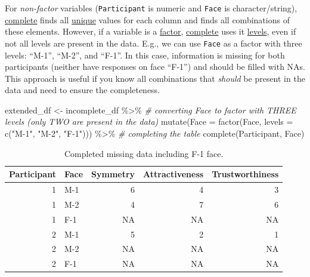 \documentclass[
]{book}
\newenvironment{Shaded}{\begin{snugshade}}{\end{snugshade}}
\newcommand{\AttributeTok}[1]{\textcolor[rgb]{0.77,0.63,0.00}{#1}}
\newcommand{\CommentTok}[1]{\textcolor[rgb]{0.56,0.35,0.01}{\textit{#1}}}
\newcommand{\FunctionTok}[1]{\textcolor[rgb]{0.00,0.00,0.00}{#1}}
\newcommand{\NormalTok}[1]{#1}
\newcommand{\OtherTok}[1]{\textcolor[rgb]{0.56,0.35,0.01}{#1}}
\newcommand{\SpecialCharTok}[1]{\textcolor[rgb]{0.00,0.00,0.00}{#1}}
\newcommand{\StringTok}[1]{\textcolor[rgb]{0.31,0.60,0.02}{#1}}
\begin{document}
For \emph{non-factor} variables (\texttt{Participant} is numeric and \texttt{Face} is character/string), \href{https://tidyr.tidyverse.org/reference/complete.html}{complete} finds all \href{https://stat.ethz.ch/R-manual/R-devel/library/base/html/unique.html}{unique} values for each column and finds all combinations of these elements. However, if a variable is a \protect\hyperlink{factors}{factor}, \href{https://tidyr.tidyverse.org/reference/complete.html}{complete} uses it \href{https://stat.ethz.ch/R-manual/R-devel/library/base/html/levels.html}{levels}, even if not all levels are present in the data. E.g., we can use \texttt{Face} as a factor with three levels: ``M-1'', ``M-2'', and ``F-1''. In this case, information is missing for both participants (neither have responses on face ``F-1'') and should be filled with NAs. This approach is useful if you know all combinations that \emph{should} be present in the data and need to ensure the completeness.

\begin{Shaded}
\begin{Highlighting}[]
\NormalTok{extended\_df }\OtherTok{\textless{}{-}}
\NormalTok{  incomplete\_df }\SpecialCharTok{\%\textgreater{}\%}
  \CommentTok{\# converting Face to factor with THREE levels (only TWO are present in the data)}
  \FunctionTok{mutate}\NormalTok{(}\AttributeTok{Face =} \FunctionTok{factor}\NormalTok{(Face, }\AttributeTok{levels =} \FunctionTok{c}\NormalTok{(}\StringTok{"M{-}1"}\NormalTok{, }\StringTok{"M{-}2"}\NormalTok{, }\StringTok{"F{-}1"}\NormalTok{))) }\SpecialCharTok{\%\textgreater{}\%}
  \CommentTok{\# completing the table}
  \FunctionTok{complete}\NormalTok{(Participant, Face)}
\end{Highlighting}
\end{Shaded}

\begin{table}

\caption{\label{tab:unnamed-chunk-279}Completed missing data including F-1 face.}
\centering
\begin{tabular}[t]{r|l|r|r|r}
\hline
Participant & Face & Symmetry & Attractiveness & Trustworthiness\\
\hline
1 & M-1 & 6 & 4 & 3\\
\hline
1 & M-2 & 4 & 7 & 6\\
\hline
1 & F-1 & NA & NA & NA\\
\hline
2 & M-1 & 5 & 2 & 1\\
\hline
2 & M-2 & NA & NA & NA\\
\hline
2 & F-1 & NA & NA & NA\\
\hline
\end{tabular}
\end{table}
\end{document}
